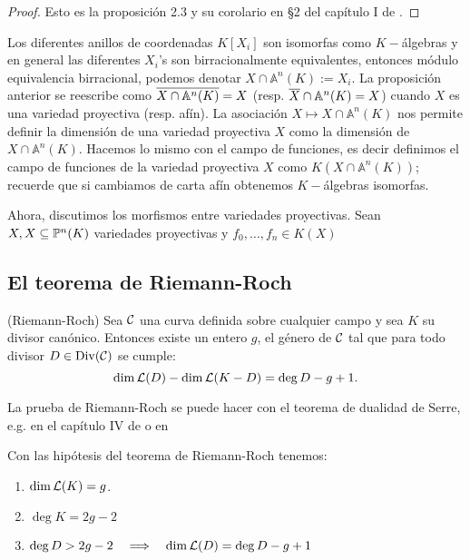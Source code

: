 \begin{proof}
	Esto es la proposición 2.3 y su corolario en \S2 del capítulo I de \cite{HartshorneAG}.
\end{proof}

\begin{nota}
	Los diferentes anillos de coordenadas $K[X_i]$ son isomorfas como $K-$álgebras y en general las diferentes $X_i$'s son birracionalmente equivalentes, entonces módulo equivalencia birracional, podemos denotar $X\cap\mathbb{A}^n(K):= X_i$. La proposición anterior se reescribe como $\overline{X\cap\mathbb{A}^n(K)}=X$ (resp. $\overline{X}\cap\mathbb{A}^n(K)=X$) cuando $X$ es una variedad proyectiva (resp. afín). La asociación $X\mapsto X\cap\mathbb{A}^n(K)$ nos permite definir la dimensión de una variedad proyectiva $X$ como la dimensión de $X\cap\mathbb{A}^n(K)$. Hacemos lo mismo con el campo de funciones, es decir definimos el campo de funciones de la variedad proyectiva $X$ como $K(X\cap\mathbb{A}^n(K))$; recuerde que si cambiamos de carta afín obtenemos $K-$álgebras isomorfas.
\end{nota}

Ahora, discutimos los morfismos entre variedades proyectivas. Sean $X,X\subseteq\mathbb{P}^n(K)$ variedades proyectivas y $f_0,\ldots,f_n\in K(X)$







\subsection{El teorema de Riemann-Roch}

\begin{thm}\label{thm:riemann-roch}(Riemann-Roch)
	Sea $\mathcal{C}$ una curva definida sobre cualquier campo y sea $K$ su divisor canónico. Entonces existe un entero $g$, el género de $\mathcal{C}$ tal que para todo divisor $D\in\mathrm{Div}(\mathcal{C})$ se cumple:
	\[
		\dim\mathcal{L}(D)-\dim\mathcal{L}(K-D)=\deg D-g+1.
	\]
\end{thm}

La prueba de Riemann-Roch se puede hacer con el teorema de dualidad de Serre, e.g. en el capítulo IV de \cite{HartshorneAG} o en \cite{SerreGAECDC}


\begin{cor} Con las hipótesis del teorema de Riemann-Roch tenemos:
\begin{enumerate}[label=(\roman*)]
\item $\dim\mathcal{L}(K)=g$.
\item $\deg K=2g-2$
\item $\deg D>2g-2\quad\Longrightarrow\quad \dim\mathcal{L}(D)=\deg D-g+1$
\end{enumerate}
\end{cor}

